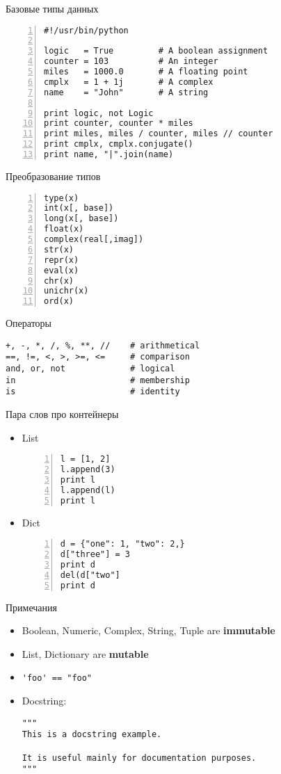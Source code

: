 \documentclass[hyperref={pdftex,unicode}]{beamer}
\begin{document}
\begin{frame}[fragile]{Базовые типы данных}
  \begin{lstlisting}[numbers=left]
#!/usr/bin/python

logic   = True         # A boolean assignment
counter = 103          # An integer 
miles   = 1000.0       # A floating point
cmplx   = 1 + 1j       # A complex 
name    = "John"       # A string

print logic, not Logic
print counter, counter * miles
print miles, miles / counter, miles // counter
print cmplx, cmplx.conjugate()
print name, "|".join(name)
\end{lstlisting}
\end{frame}

\begin{frame}[fragile]{Преобразование типов}
  \begin{lstlisting}[numbers=left]
type(x)
int(x[, base])
long(x[, base])
float(x)
complex(real[,imag])
str(x)
repr(x)
eval(x)
chr(x)
unichr(x)
ord(x)
\end{lstlisting}
\end{frame}

\begin{frame}[fragile]{Операторы}
\begin{lstlisting}
+, -, *, /, %, **, //    # arithmetical
==, !=, <, >, >=, <=     # comparison
and, or, not             # logical
in                       # membership
is                       # identity
\end{lstlisting}
\end{frame}

\begin{frame}[fragile]{Пара слов про контейнеры}
  \begin{itemize}
    \item List
      \begin{lstlisting}[numbers=left]
l = [1, 2]
l.append(3)
print l
l.append(l)
print l
      \end{lstlisting}
    \item Dict
      \begin{lstlisting}[numbers=left]
d = {"one": 1, "two": 2,}
d["three"] = 3
print d
del(d["two"]
print d
      \end{lstlisting}
  \end{itemize}
\end{frame}

\begin{frame}[fragile]{Примечания}
  \begin{itemize}
    \item Boolean, Numeric, Complex, String, Tuple are \textbf{immutable}
    \item List, Dictionary are \textbf{mutable}
    \item \lstinline$'foo' == "foo"$
    \item Docstring:
      \begin{lstlisting}
"""
This is a docstring example.

It is useful mainly for documentation purposes.
"""
      \end{lstlisting}
  \end{itemize}
\end{frame}
\end{document}
